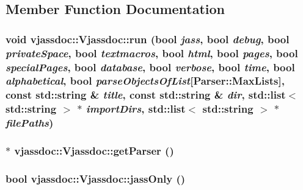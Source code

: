 \subsection{Member Function Documentation}
\hypertarget{classvjassdoc_1_1Vjassdoc_73090a0eeffae1af73d153b881fd5d03}{
\subsubsection{\setlength{\rightskip}{0pt plus 5cm}void vjassdoc::Vjassdoc::run (bool {\em jass}, bool {\em debug}, bool {\em privateSpace}, bool {\em textmacros}, bool {\em html}, bool {\em pages}, bool {\em specialPages}, bool {\em database}, bool {\em verbose}, bool {\em time}, bool {\em alphabetical}, bool {\em parseObjectsOfList}\mbox{[}Parser::MaxLists\mbox{]}, const std::string \& {\em title}, const std::string \& {\em dir}, std::list$<$ std::string $>$ $\ast$ {\em importDirs}, std::list$<$ std::string $>$ $\ast$ {\em filePaths})}}
\label{classvjassdoc_1_1Vjassdoc_73090a0eeffae1af73d153b881fd5d03}


\hypertarget{classvjassdoc_1_1Vjassdoc_b8697267d6b9ad377e05fba7132ca804}{
\subsubsection{ $\ast$ vjassdoc::Vjassdoc::getParser ()}}
\label{classvjassdoc_1_1Vjassdoc_b8697267d6b9ad377e05fba7132ca804}


\hypertarget{classvjassdoc_1_1Vjassdoc_1fe1b4e1b45efef8687def4cb833f70f}{
\subsubsection{\setlength{\rightskip}{0pt plus 5cm}bool vjassdoc::Vjassdoc::jassOnly ()}}
\label{classvjassdoc_1_1Vjassdoc_1fe1b4e1b45efef8687def4cb833f70f}



